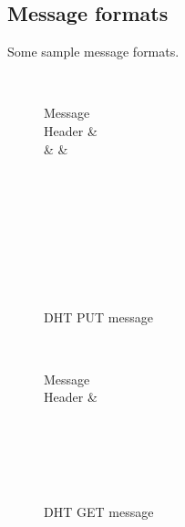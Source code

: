 \documentclass[a4paper, 11pt]{article}
\begin{document}
\subsection*{Message formats}

Some sample message formats.
\begin{figure}[h!]
	\centering
	\begin{bytefield}[bitwidth=0.8em]{32}
		 \\
		\begin{rightwordgroup}{Message \\  Header}
			 &  \\
			 &  & 
		\end{rightwordgroup} \\
		 \\
		\skippedwords \\
		 \\
		 \\
		\skippedwords \\
		 \\
	\end{bytefield}
	\caption{DHT PUT message}
	\label{DHTPUT}
\end{figure}

\begin{figure}[h!]
	\centering
	\begin{bytefield}[bitwidth=0.8em]{32}
		 \\
		\begin{rightwordgroup}{Message \\  Header}
			 & 
		\end{rightwordgroup} \\
		 \\
		\skippedwords \\
		 \\
	\end{bytefield}
	\caption{DHT GET message}
	\label{DHTGET}
\end{figure}
\end{document}
